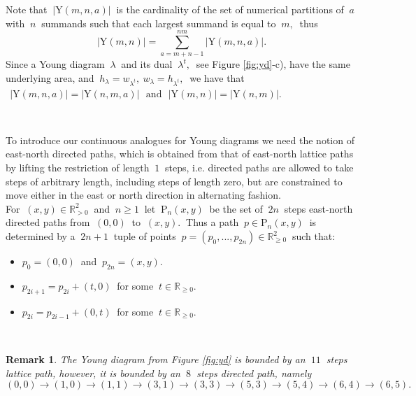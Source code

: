 \documentclass[10pt,leqeq]{article}
\newtheorem{rem}[thm]{Remark}
\begin{document}
Note that $ \  \big|\mathrm{Y}(m,n,a)\big|   \  $  is the cardinality of the set of numerical partitions of $\ a \ $ with $\ n \ $ summands such that each largest summand is equal to $ \ m, \ $ thus
$$ \ \big|\mathrm{Y}(m,n)\big|= \sum_{a=m+n-1}^{nm}\big|\mathrm{Y}(m,n,a)\big| . \ $$ Since a Young diagram $\ \lambda \ $ and its dual $\ \lambda^t, \ $
see Figure \ref{fig:yd}-c), have the same underlying area, and 
$\ h_{\lambda}= w_{\lambda^t}, \  w_{\lambda}= h_{\lambda^t}, \ $
we have that   
$\ \ \big|\mathrm{Y}(m,n,a)\big|=\big|\mathrm{Y}(n,m,a)\big| \ \ \  \mbox{and} \ \ \   \big|\mathrm{Y}(m,n)\big|= \big|\mathrm{Y}(n,m)\big|.$

\

To introduce our continuous analogues for Young diagrams we need the notion of  east-north directed paths, which is obtained from that of east-north lattice paths by lifting the restriction of length $\ 1 \ $ steps, i.e. directed paths are allowed to take steps of arbitrary length, including steps of length zero, but are constrained to move either in the east or north direction in alternating fashion. \\

For $\ (x,y)\in \mathbb{R}_{> 0}^2\ $ and $\ n\geq 1\ $ let $\ \mathrm{P}_n(x,y) \ $ be the set of $\ 2n \ $ steps east-north directed paths from $\ (0,0) \ $ to $\ (x,y).\ $
Thus a path $\ p\in \mathrm{P}_n(x,y) \ $ is determined by a $\ 2n+1\ $ tuple of points $\ p=(p_0,...,p_{2n}) \in \mathbb{R}_{\geq 0}^2\ $ such that:
\begin{itemize}
  \item $p_0=(0,0)\ $ and $\ p_{2n}=(x,y).$
  \item $p_{2i+1}=p_{2i}+(t,0)\ $ for some $\ t\in \mathbb{R}_{\geq 0}.$
  \item $p_{2i}=p_{2i-1}+(0,t)\ $ for some $\ t\in \mathbb{R}_{\geq 0}.$
\end{itemize}

\

\begin{rem}
{\em  The Young diagram from Figure \ref{fig:yd} is bounded by an $\ 11 \ $ steps lattice path, however, it is bounded by an  $\ 8 \ $ steps directed path, namely
$$(0,0)\rightarrow (1,0)\rightarrow (1,1)\rightarrow (3,1)\rightarrow
(3,3)\rightarrow (5,3)\rightarrow (5,4)\rightarrow (6,4)\rightarrow (6,5).$$  
}
\end{rem}

\
\end{document}
